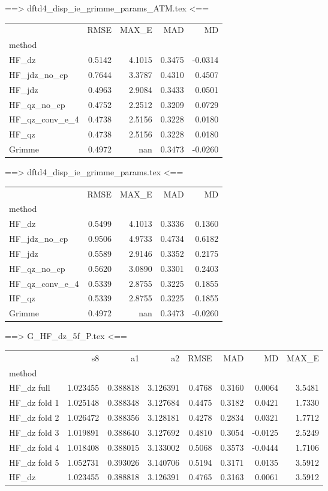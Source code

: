 ==> dftd4_disp_ie_grimme_params_ATM.tex <==
\begin{tabular}{lrrrr}
 & RMSE & MAX_E & MAD & MD \\
method &  &  &  &  \\
HF_dz & 0.5142 & 4.1015 & 0.3475 & -0.0314 \\
HF_jdz_no_cp & 0.7644 & 3.3787 & 0.4310 & 0.4507 \\
HF_jdz & 0.4963 & 2.9084 & 0.3433 & 0.0501 \\
HF_qz_no_cp & 0.4752 & 2.2512 & 0.3209 & 0.0729 \\
HF_qz_conv_e_4 & 0.4738 & 2.5156 & 0.3228 & 0.0180 \\
HF_qz & 0.4738 & 2.5156 & 0.3228 & 0.0180 \\
Grimme & 0.4972 & nan & 0.3473 & -0.0260 \\
\end{tabular}

==> dftd4_disp_ie_grimme_params.tex <==
\begin{tabular}{lrrrr}
 & RMSE & MAX_E & MAD & MD \\
method &  &  &  &  \\
HF_dz & 0.5499 & 4.1013 & 0.3336 & 0.1360 \\
HF_jdz_no_cp & 0.9506 & 4.9733 & 0.4734 & 0.6182 \\
HF_jdz & 0.5589 & 2.9146 & 0.3352 & 0.2175 \\
HF_qz_no_cp & 0.5620 & 3.0890 & 0.3301 & 0.2403 \\
HF_qz_conv_e_4 & 0.5339 & 2.8755 & 0.3225 & 0.1855 \\
HF_qz & 0.5339 & 2.8755 & 0.3225 & 0.1855 \\
Grimme & 0.4972 & nan & 0.3473 & -0.0260 \\
\end{tabular}

==> G_HF_dz_5f_P.tex <==
\begin{tabular}{lrrrrrrr}
 & s8 & a1 & a2 & RMSE & MAD & MD & MAX_E \\
method &  &  &  &  &  &  &  \\
HF_dz full & 1.023455 & 0.388818 & 3.126391 & 0.4768 & 0.3160 & 0.0064 & 3.5481 \\
HF_dz fold 1 & 1.025148 & 0.388348 & 3.127684 & 0.4475 & 0.3182 & 0.0421 & 1.7330 \\
HF_dz fold 2 & 1.026472 & 0.388356 & 3.128181 & 0.4278 & 0.2834 & 0.0321 & 1.7712 \\
HF_dz fold 3 & 1.019891 & 0.388640 & 3.127692 & 0.4810 & 0.3054 & -0.0125 & 2.5249 \\
HF_dz fold 4 & 1.018408 & 0.388015 & 3.133002 & 0.5068 & 0.3573 & -0.0444 & 1.7106 \\
HF_dz fold 5 & 1.052731 & 0.393026 & 3.140706 & 0.5194 & 0.3171 & 0.0135 & 3.5912 \\
HF_dz & 1.023455 & 0.388818 & 3.126391 & 0.4765 & 0.3163 & 0.0061 & 3.5912 \\
\end{tabular}

